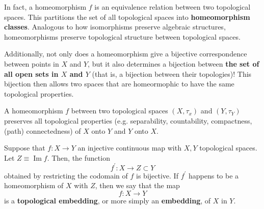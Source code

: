 \documentclass{article}
\DeclareMathOperator{\im}{Im}
\begin{document}
    In fact, a homeomorphism $f$ is an equivalence relation between two topological spaces. This partitions the set of all topological spaces into \textbf{homeomorphism classes}. Analogous to how isomorphisms preserve algebraic structures, homeomorphisms preserve topological structure between topological spaces. 

    Additionally, not only does a homeomorphism give a bijective correspondence between points in $X$ and $Y$, but it also determines a bijection between \textbf{the set of all open sets in $X$ and $Y$} (that is, a bijection between their topologies)! This bijection then allows two spaces that are homeormophic to have the same topological properties. 

    \begin{proposition}
      A homeomorphism $f$ between two topological spaces $(X, \tau_{x})$ and $(Y, \tau_{Y})$ preserves all topological properties (e.g. separability, countability, compactness, (path) connectedness) of $X$ onto $Y$ and $Y$ onto $X$. 
    \end{proposition}

    \begin{definition}
      Suppose that $f: X \longrightarrow Y$ an injective continuous map with $X, Y$ topological spaces. Let $Z \equiv \im{f}$. Then, the function
      \begin{equation}
        f^\prime: X \longrightarrow Z \subset Y
      \end{equation}
      obtained by restricting the codomain of $f$ is bijective. If $f^\prime$ happens to be a homeomorphism of $X$ with $Z$, then we say that the map
      \begin{equation}
        f: X \longrightarrow Y
      \end{equation}
      is a \textbf{topological embedding}, or more simply an \textbf{embedding}, of $X$ in $Y$. 
    \end{definition}
\end{document}
